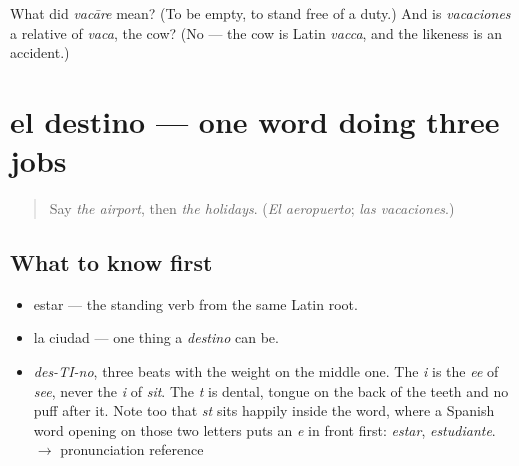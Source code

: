 \begin{tcolorbox}[breakable,colback=teal!4,colframe=teal!35!black,title={Before you move on}]
What did \emph{vacāre} mean? (To be empty, to stand free of a duty.) And is \emph{vacaciones} a relative of \emph{vaca}, the cow? (No — the cow is Latin \emph{vacca}, and the likeness is an accident.)
\end{tcolorbox}
\section[el destino]{el destino — one word doing three jobs}

\label{lesson:ES-C392-destino}



\begin{quote}
Say \emph{the airport}, then \emph{the holidays}. (\emph{El aeropuerto}; \emph{las vacaciones}.)
\end{quote}

\subsection*{What to know first}
\begin{itemize}
\raggedright
  \item estar — the standing verb from the same Latin root.
  \item la ciudad — one thing a \emph{destino} can be.
\end{itemize}

\begin{sounds}
\begin{itemize}
\raggedright
  \item \emph{des-TI-no}, three beats with the weight on the middle one. The \emph{i} is the \emph{ee} of \emph{see}, never the \emph{i} of \emph{sit}. The \emph{t} is dental, tongue on the back of the teeth and no puff after it. Note too that \emph{st} sits happily inside the word, where a Spanish word opening on those two letters puts an \emph{e} in front first: \emph{estar}, \emph{estudiante}. $\to$ pronunciation reference
\end{itemize}
\end{sounds}

